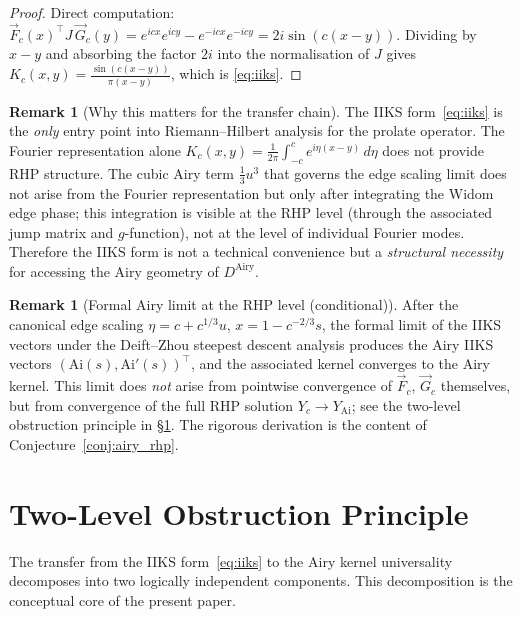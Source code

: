 \documentclass[12pt,a4paper]{amsart}
\theoremstyle{definition}
\newtheorem{remark}[theorem]{Remark}
\newcommand{\Fvec}{\vec{F}_c}
\newcommand{\Gvec}{\vec{G}_c}
\begin{document}
\begin{proof}
Direct computation:
$\Fvec(x)^\top J\,\Gvec(y)
= e^{icx}e^{icy} - e^{-icx}e^{-icy}
= 2i\sin(c(x-y))$.
Dividing by $x-y$ and absorbing the factor $2i$ into the
normalisation of $J$ gives
$K_c(x,y) = \frac{\sin(c(x-y))}{\pi(x-y)}$,
which is \eqref{eq:iiks}.
\end{proof}

\begin{remark}[Why this matters for the transfer chain]
The IIKS form~\eqref{eq:iiks} is the \emph{only} entry point
into Riemann--Hilbert analysis for the prolate operator.
The Fourier representation alone
$K_c(x,y) = \frac{1}{2\pi}\int_{-c}^c e^{i\eta(x-y)}\,d\eta$
does not provide RHP structure.
The cubic Airy term $\tfrac{1}{3}u^3$ that governs the
edge scaling limit does not arise from the Fourier representation
but only after integrating the Widom edge phase; this integration
is visible at the RHP level (through the associated jump matrix
and $g$-function), not at the level of individual Fourier modes.
Therefore the IIKS form is not a technical convenience but a
\emph{structural necessity} for accessing the Airy geometry
of $D^{\mathrm{Airy}}$.
\end{remark}

\begin{remark}[Formal Airy limit at the RHP level (conditional)]
After the canonical edge scaling
$\eta = c + c^{1/3}u$, $x = 1 - c^{-2/3}s$,
the formal limit of the IIKS vectors under the
Deift--Zhou steepest descent analysis produces
the Airy IIKS vectors
$(\mathrm{Ai}(s), \mathrm{Ai}'(s))^\top$,
and the associated kernel converges to the Airy kernel.
This limit does \emph{not} arise from pointwise convergence
of $\Fvec$, $\Gvec$ themselves, but from convergence of the
full RHP solution $Y_c \to Y_{\mathrm{Ai}}$;
see the two-level obstruction principle in \S\ref{sec:obstruction}.
The rigorous derivation is the content of
Conjecture~\ref{conj:airy_rhp}.
\end{remark}

\section{Two-Level Obstruction Principle}\label{sec:obstruction}

The transfer from the IIKS form~\eqref{eq:iiks} to the
Airy kernel universality decomposes into two logically
independent components.
This decomposition is the conceptual core of the present paper.
\end{document}
